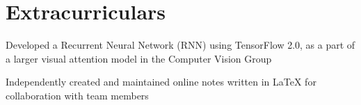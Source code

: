 \begin{minipage}[t]{0.66\textwidth}
 \sectionspace %




 \section{Extracurriculars}
 \begin{tightitemize}
  \item Developed a Recurrent Neural Network (RNN) using TensorFlow 2.0, as a part of a larger visual attention model in the Computer Vision Group
  \item Independently created and maintained online notes written in LaTeX for collaboration with team members
 \end{tightitemize}
 \sectionspace %




\end{minipage}
